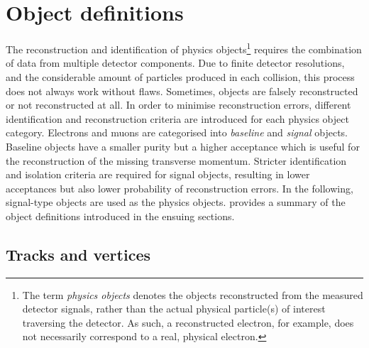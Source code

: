 \section{Object definitions}\label{sec:object_definitions}

The reconstruction and identification of physics objects\footnote{The term \textit{physics objects} denotes the objects reconstructed from the measured detector signals, rather than the actual physical particle(s) of interest traversing the detector. As such, a reconstructed electron, for example, does not necessarily correspond to a real, physical electron.} requires the combination of data from multiple detector components.
Due to finite detector resolutions, and the considerable amount of particles produced in each collision, this process does not always work without flaws.
Sometimes, objects are falsely reconstructed or not reconstructed at all. In order to minimise reconstruction errors, different identification and reconstruction criteria are introduced for each physics object category. Electrons and muons are categorised into \textit{baseline} and \textit{signal} objects.
Baseline objects have a smaller purity but a higher acceptance which is \eg useful for the reconstruction of the missing transverse momentum. Stricter identification and isolation criteria are required for signal objects, resulting in lower acceptances but also lower probability of reconstruction errors.
In the following, signal-type objects are used as the physics objects.  provides a summary of the object definitions introduced in the ensuing sections.

\subsection{Tracks and vertices}\label{sec:reco_tracks}

